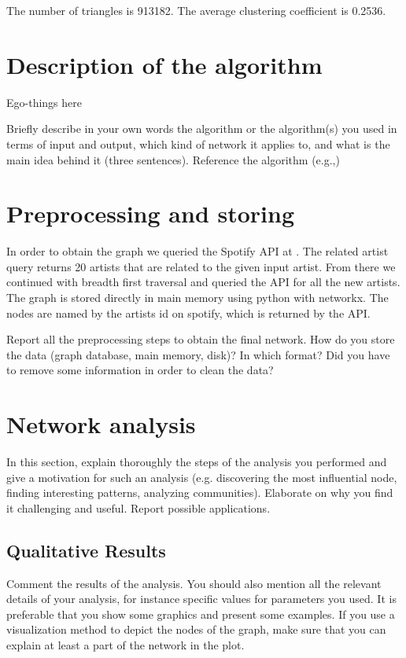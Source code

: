 \documentclass[11pt,a4paper,onecolumn,notitlepage]{article}
\begin{document}
The number of triangles is 913182. The average clustering coefficient is 0.2536.

\section{Description of the algorithm}

Ego-things here

Briefly describe in your own words the algorithm or the algorithm(s) you used in terms of input and output, which kind of network it applies to, and what is the main idea behind it (three sentences). Reference the algorithm (e.g.,\cite{zhao2007graph})

\section{Preprocessing and storing}

In order to obtain the graph we queried the Spotify API at \cite{spotifyapi}. The related artist query returns 20 artists that are related to the given input artist.
From there we continued with breadth first traversal and queried the API for all the new artists. The graph is stored directly in main memory using python with networkx.
The nodes are named by the artists id on spotify, which is returned by the API.

Report all the preprocessing steps to obtain the final network. How do you store the data (graph database, main memory, disk)? In which format? Did you have to remove some information in order to clean the data? 

\section{Network analysis}

In this section, explain thoroughly the steps of the analysis you performed and give a motivation for such an analysis (e.g. discovering the most influential node, finding interesting patterns, analyzing communities). Elaborate on why you find it challenging and useful. Report possible applications.  

\subsection{Qualitative Results}

Comment the results of the analysis. You should also mention all the relevant details of your analysis, for instance specific values for parameters you used. It is preferable that you show some graphics and present some examples. If you use a visualization method to depict the nodes of the graph, make sure that you can explain at least a part of the network in the plot. 
\end{document}
